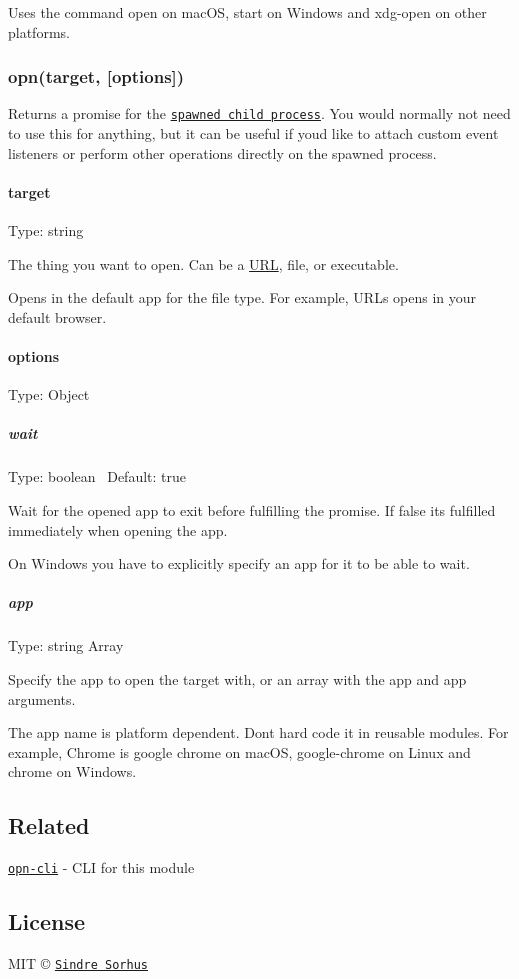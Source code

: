 Uses the command {\ttfamily open} on mac\+OS, {\ttfamily start} on Windows and {\ttfamily xdg-\/open} on other platforms.

\subsubsection*{opn(target, \mbox{[}options\mbox{]})}

Returns a promise for the \href{https://nodejs.org/api/child_process.html#child_process_class_childprocess}{\tt spawned child process}. You would normally not need to use this for anything, but it can be useful if you\textquotesingle{}d like to attach custom event listeners or perform other operations directly on the spawned process.

\paragraph*{target}

Type\+: {\ttfamily string}

The thing you want to open. Can be a \mbox{\hyperlink{namespace_u_r_l}{U\+RL}}, file, or executable.

Opens in the default app for the file type. For example, U\+R\+Ls opens in your default browser.

\paragraph*{options}

Type\+: {\ttfamily Object}

\subparagraph*{wait}

Type\+: {\ttfamily boolean}~\newline
 Default\+: {\ttfamily true}

Wait for the opened app to exit before fulfilling the promise. If {\ttfamily false} it\textquotesingle{}s fulfilled immediately when opening the app.

On Windows you have to explicitly specify an app for it to be able to wait.

\subparagraph*{app}

Type\+: {\ttfamily string} {\ttfamily Array}

Specify the app to open the {\ttfamily target} with, or an array with the app and app arguments.

The app name is platform dependent. Don\textquotesingle{}t hard code it in reusable modules. For example, Chrome is {\ttfamily google chrome} on mac\+OS, {\ttfamily google-\/chrome} on Linux and {\ttfamily chrome} on Windows.

\subsection*{Related}


\begin{DoxyItemize}
\item \href{https://github.com/sindresorhus/opn-cli}{\tt opn-\/cli} -\/ C\+LI for this module
\end{DoxyItemize}

\subsection*{License}

M\+IT © \href{https://sindresorhus.com}{\tt Sindre Sorhus} 